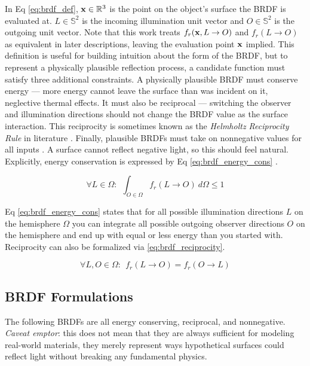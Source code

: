 In Eq \ref{eq:brdf_def}, $\mathbf{x} \in \mathbb{R}^3$ is the point on the object's surface the BRDF is evaluated at. $L \in \mathbb{S}^2$ is the incoming illumination unit vector and $O \in \mathbb{S}^2$ is the outgoing unit vector. Note that this work treats $f_r(\mathbf{x}, L \rightarrow O)$ and $f_r(L \rightarrow O)$ as equivalent in later descriptions, leaving the evaluation point $\mathbf{x}$ implied. This definition is useful for building intuition about the form of the BRDF, but to represent a physically plausible reflection process, a candidate function must satisfy three additional constraints. A physically plausible BRDF must conserve energy --- more energy cannot leave the surface than was incident on it, neglective thermal effects. It must also be reciprocal --- switching the observer and illumination directions should not change the BRDF value as the surface interaction. This reciprocity is sometimes known as the \textit{Helmholtz Reciprocity Rule} in literature \cite{montes2012}. Finally, plausible BRDFs must take on nonnegative values for all inputs \cite{montes2012}. A surface cannot reflect negative light, so this should feel natural. Explicitly, energy conservation is expressed by Eq \ref{eq:brdf_energy_cons} \cite{montes2012}.

\begin{equation} \label{eq:brdf_energy_cons}
  \forall L \in \Omega : \:\: \int_{O \in \Omega} f_r(L \rightarrow O) \: d\Omega \leq 1
\end{equation}

Eq \ref{eq:brdf_energy_cons} states that for all possible illumination directions $L$ on the hemisphere $\Omega$ you can integrate all possible outgoing observer directions $O$ on the hemisphere and end up with equal or less energy than you started with. Reciprocity can also be formalized via \ref{eq:brdf_reciprocity}.

\begin{equation} \label{eq:brdf_reciprocity}
  \forall L, O \in \Omega : \:\: f_r(L \rightarrow O) = f_r(O \rightarrow L)
\end{equation}

\subsection{BRDF Formulations}

The following BRDFs are all energy conserving, reciprocal, and nonnegative. \textit{Caveat emptor}: this does not mean that they are always sufficient for modeling real-world materials, they merely represent ways hypothetical surfaces could reflect light without breaking any fundamental physics.

